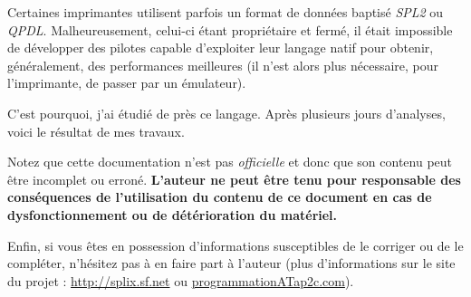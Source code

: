 Certaines imprimantes utilisent parfois un format de données baptisé 
\emph{SPL2} ou \emph{QPDL}. Malheureusement, celui-ci étant propriétaire et 
fermé, il était impossible de développer des pilotes capable d'exploiter
leur langage natif pour obtenir, généralement, des performances meilleures
(il n'est alors plus nécessaire, pour l'imprimante, de passer par un 
émulateur). 

C'est pourquoi, j'ai étudié de près ce langage. Après plusieurs jours 
d'analyses, voici le résultat de mes travaux.
\medskip

Notez que cette documentation n'est pas \emph{officielle} et donc que 
son contenu peut être incomplet ou erroné. \textbf{L'auteur ne peut être 
tenu pour responsable des conséquences de l'utilisation du contenu de ce 
document en cas de dysfonctionnement ou de détérioration du matériel.}
\medskip

Enfin, si vous êtes en possession d'informations susceptibles de le corriger
ou de le compléter, n'hésitez pas à en faire part à l'auteur (plus
d'informations sur le site du projet : \url{http://splix.sf.net} ou
\url{programmationATap2c.com}).
